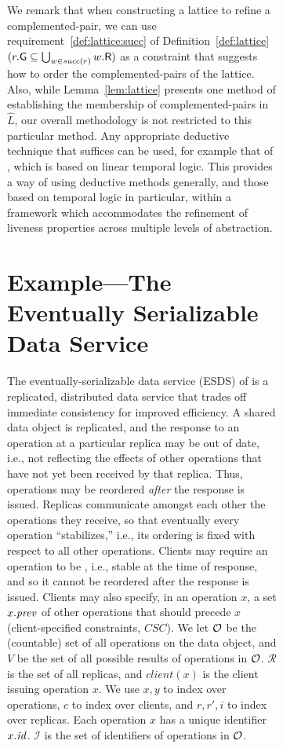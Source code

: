 \documentclass[11pt]{article}
\newcommand{\UN}{\bigcup}
\newcommand{\G}{\mathsf{G}}
\newcommand{\R}{\mathsf{R}}
\newcommand{\clos}[1]{\widehat{{#1}}}	\newcommand{\esig}{\mathit{esig}}
\newcommand{\client}{\mathit{client}}
\newcommand{\ms}[1]{\relax\ifmmode
                \mathord{\mathcode`\-="702D\it #1\mathcode`\-="2200}\else
{\it #1}\fi
}
\newcommand{\Op}{{\cal O}}
\newcommand{\prev}{\ms{prev}}
\newcommand{\idof}[1]{{#1}.\ms{id}}
\newcommand{\CSC}{\mathit{CSC}}
\newcommand{\idset}{\mathcal{I}}
\newcommand{\reps}{\mathcal{R}}
\begin{document}
\begin{figure}[htb]
\begin{figure}[htb]
We remark that when constructing a lattice to refine a complemented-pair, we can use
requirement~\ref{def:lattice:succ} of Definition~\ref{def:lattice}
$(r.\G \subseteq \UN_{w \in \suc(r)} w.\R)$ as a
constraint that suggests how to order the complemented-pairs of the
lattice.
Also, while Lemma~\ref{lem:lattice} presents one method of establishing the
membership of complemented-pairs in $\clos{L}$, our overall
methodology is not restricted to this particular method. Any
appropriate deductive technique that suffices can be used, for example that of 
\cite{MP93}, which is based on linear temporal logic.
This provides a way of using deductive methods generally, 
and those based on temporal logic in particular, within a
framework which accommodates the refinement of liveness properties 
across multiple levels of abstraction.












\section{Example---The Eventually Serializable Data Service}
\label{sec:example}

The eventually-serializable data service (ESDS) of \cite{FGLLS99,LLSG92} is a
replicated, distributed data service that trades off immediate
consistency for improved efficiency. A shared data object is
replicated, and the response to an operation at a particular replica
may be out of date, i.e., not reflecting the effects of other
operations that have not yet been received by that replica. Thus,
operations may be reordered \emph{after} the response is issued.
Replicas communicate amongst each other the operations they receive,
so that eventually every operation ``stabilizes,'' i.e., its ordering
is fixed with respect to all other operations. Clients may require an operation
to be , i.e., stable at the time of response, and so
it cannot be reordered after the response is issued. Clients may also
specify, in an operation $x$, a set $x.\prev$ of other
operations that should precede $x$ (client-specified constraints, $\CSC$).
We let $\Op$ be the (countable) set of all operations on the data object,
and $V$ be the set of all possible results of operations in $\Op$.
$\reps$ is the set of all replicas, and
$\client(x)$ is the client issuing operation $x$.
We use $x,y$ to index over operations, 
$c$ to index over clients, and $r,r',i$ to index over replicas.
Each operation $x$ has a unique identifier $\idof{x}$. 
$\idset$ is the set of identifiers of operations in $\Op$.



\end{figure}
\end{figure}
\end{document}
